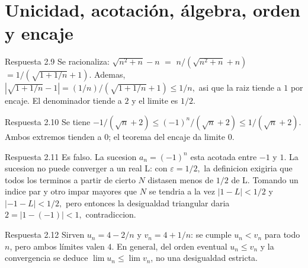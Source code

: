 \documentclass[10pt,a4paper,oneside,openany]{book}
\begin{document}
\section{Unicidad, acotación, álgebra, orden y encaje}
\begin{PSevenAnswerFixed}{Respuesta 2.9}
Se racionaliza: \(\sqrt{n^{2}+n}-n\) \(=\) \(n/(\sqrt{n^{2}+n}+n)\) \(=1/(\sqrt{1+1/n}+1)\). Ademas, \(|\sqrt{1+1/n}-1|=(1/n)/(\sqrt{1+1/n}+1)\le 1/n,\) asi que la raiz tiende a \(1\) por encaje. El denominador tiende a \(2\) y el limite es \(1/2\).
\end{PSevenAnswerFixed}
\begin{PSevenAnswerFixed}{Respuesta 2.10}
Se tiene \(-1/(\sqrt{n}+2)\le (-1)^n/(\sqrt{n}+2)\le 1/(\sqrt{n}+2)\). Ambos extremos tienden a \(0\); el teorema del encaje da limite \(0\).
\end{PSevenAnswerFixed}
\begin{PSevenAnswerFixed}{Respuesta 2.11}
Es falso. La sucesion \(a_n=(-1)^n\) esta acotada entre \(-1\) y \(1\). La sucesion no puede converger a un real L: con \(\varepsilon =1/2,\) la definicion exigiria que todos los terminos a partir de cierto \(N\) distasen menos de \(1/2\) de L. Tomando un indice par y otro impar mayores que \(N\) se tendria a la vez \(|1-L|<1/2\) y \(|-1-L|<1/2,\) pero entonces la desigualdad triangular daria \(2=|1-(-1)|<1,\) contradiccion.
\end{PSevenAnswerFixed}
\begin{PSevenAnswerFixed}{Respuesta 2.12}
Sirven \(u_n=4-2/n\) y \(v_n=4+1/n\): se cumple \(u_n<v_n\) para todo \(n\), pero ambos límites valen \(4\). En general, del orden eventual \(u_n\le v_n\) y la convergencia se deduce \(\lim u_n\le\lim v_n\), no una desigualdad estricta.
\end{PSevenAnswerFixed}
\end{document}
